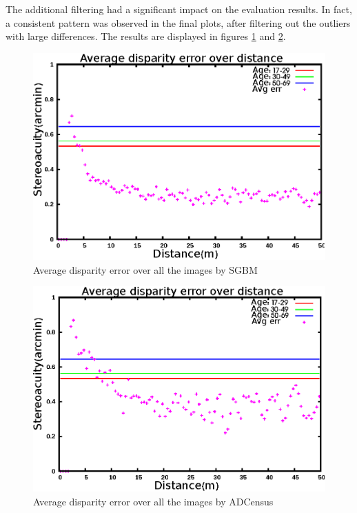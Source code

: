 The additional filtering had a significant impact on the evaluation results. In fact, a consistent pattern was observed in the final plots, after filtering out the
outliers with large differences. The results are displayed in
figures \ref{fig:mskmapsgbm} and \ref{fig:mskmapadc}.

\begin{figure}[H]
\centering
\includegraphics[scale=0.8]{sgbmmsk3}
\caption{Average disparity error over all the images by SGBM}
\label{fig:mskmapsgbm}
\end{figure} 

\begin{figure}[H]
\centering
\includegraphics[scale=0.8]{adcenmsk3}
\caption{Average disparity error over all the images by ADCensus}
\label{fig:mskmapadc}
\end{figure} 

